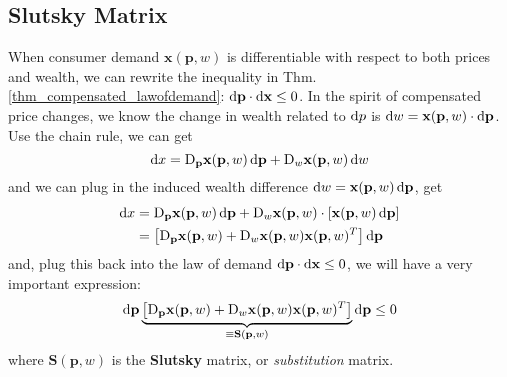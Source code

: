 \subsection{Slutsky Matrix}
When consumer demand $\mathbf{x}(\mathbf{p},w)$ is differentiable with respect to both prices and wealth, we can rewrite the inequality in Thm.\ref{thm_compensated_lawofdemand}: $\mathop{}\!\mathrm{d} \mathbf{p}\cdot \mathop{}\!\mathrm{d} \mathbf{x}\leq 0$. In the spirit of compensated price changes, we know the change in wealth related to $\mathop{}\!\mathrm{d} p$ is $\mathop{}\!\mathrm{d} w=\mathbf{x}(\mathbf{p},w)\cdot \mathop{}\!\mathrm{d} \mathbf{p}$.
Use the chain rule, we can get
$$\mathop{}\!\mathrm{d} x= \mathop{}\!\mathrm{D}_{\mathbf{p}}\mathbf{x}(\mathbf{p},w)\mathop{}\!\mathrm{d} \mathbf{p} + \mathop{}\!\mathrm{D}_w \mathbf{x}(\mathbf{p},w)\mathop{}\!\mathrm{d} w$$
and we can plug in the induced wealth difference $\mathop{}\!\mathrm{d} w=\mathbf{x}(\mathbf{p},w)\mathop{}\!\mathrm{d} \mathbf{p}$, get
\begin{align*}
    \diff x & = \mdiff_{\mathbf{p}}\mathbf{x}(\mathbf{p},w)\diff \mathbf{p} + \mdiff_w \mathbf{x}(\mathbf{p},w) \cdot \left[\mathbf{x}(\mathbf{p},w)\diff \mathbf{p}\right]\\
    & =\left[ \mdiff_{\mathbf{p}}\mathbf{x}(\mathbf{p},w) + \mdiff_w \mathbf{x}(\mathbf{p},w)\mathbf{x}(\mathbf{p},w)^T\right] \diff \mathbf{p}
\end{align*}
and, plug this back into the law of demand $ \mathop{}\!\mathrm{d} \mathbf{p}\cdot \mathop{}\!\mathrm{d} \mathbf{x}\leq 0$, we will have a very important expression:
$$
\mathop{}\!\mathrm{d} \mathbf{p} \underbrace{\left[ \mathop{}\!\mathrm{D}_{\mathbf{p}}\mathbf{x}(\mathbf{p},w) + \mathop{}\!\mathrm{D}_w \mathbf{x}(\mathbf{p},w)\mathbf{x}(\mathbf{p},w)^T\right]}_{\equiv \mathbf{S}(\mathbf{p},w)} \mathop{}\!\mathrm{d} \mathbf{p}\leq 0
$$
where $\mathbf{S}(\mathbf{p},w)$ is the \textbf{Slutsky} matrix, or \textit{substitution} matrix. 


